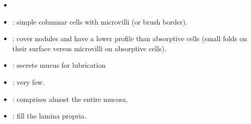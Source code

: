 \begin{itemize}
\begin{itemize}
    \hspace{15pt}
  \end{itemize}


  \begin{multicols}{2}
  \begin{itemize}
    \item {}
    
    \begin{center}
    \end{center}
    
    \item {}: simple columnar cells with microvilli (or brush border).
    
    \begin{center}
    \end{center}
    
    \item {}: cover nodules and have a lower profile than absorptive cells (small folds on their surface versus microvilli on absorptive cells).
    
    \begin{center}
    \end{center}
    
    \item {}: secrete mucus for lubrication
    
    \begin{center}
    \end{center}
    
    \item {}: very few.
    
    \begin{center}
    \end{center}
    
    \item {}: comprises almost the entire mucosa.
    
    \begin{center}
    \end{center}
    
    \item {}: fill the lamina propria.
    

\end{itemize}
\end{multicols}
\end{itemize}
